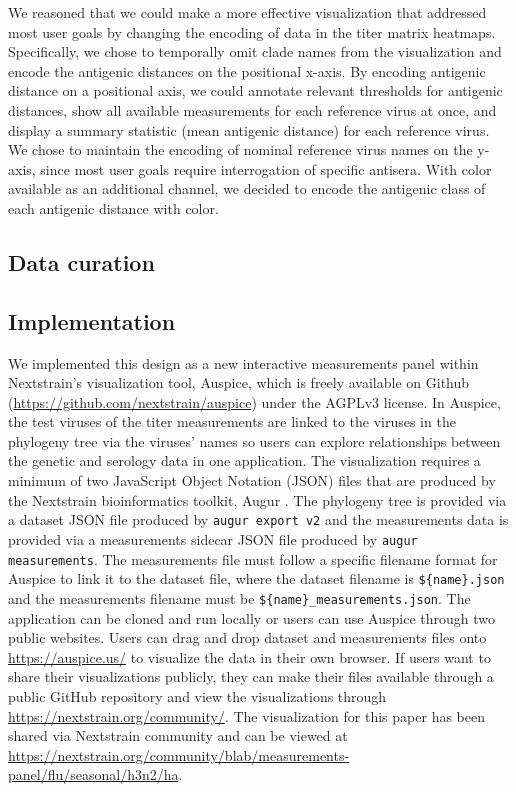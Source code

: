 \documentclass[utf8]{FrontiersinHarvard} %
\begin{document}
We reasoned that we could make a more effective visualization that addressed most user goals by changing the encoding of data in the titer matrix heatmaps.
Specifically, we chose to temporally omit clade names from the visualization and encode the antigenic distances on the positional x-axis.
By encoding antigenic distance on a positional axis, we could annotate relevant thresholds for antigenic distances, show all available measurements for each reference virus at once, and display a summary statistic (mean antigenic distance) for each reference virus.
We chose to maintain the encoding of nominal reference virus names on the y-axis, since most user goals require interrogation of specific antisera.
With color available as an additional channel, we decided to encode the antigenic class of each antigenic distance with color.

\subsection{Data curation}

\subsection{Implementation}

We implemented this design as a new interactive measurements panel within Nextstrain's visualization tool, Auspice, which is freely available on Github (\url{https://github.com/nextstrain/auspice}) under the AGPLv3 license.
In Auspice, the test viruses of the titer measurements are linked to the viruses in the phylogeny tree via the viruses' names so users can explore relationships between the genetic and serology data in one application.
The visualization requires a minimum of two JavaScript Object Notation (JSON) files that are produced by the Nextstrain bioinformatics toolkit, Augur \citep{Huddleston2021}.
The phylogeny tree is provided via a dataset JSON file produced by \texttt{augur export v2} and the measurements data is provided via a measurements sidecar JSON file produced by \texttt{augur measurements}.
The measurements file must follow a specific filename format for Auspice to link it to the dataset file, where the dataset filename is \texttt{\$\{name\}.json} and the measurements filename must be \texttt{\$\{name\}\_measurements.json}.
The application can be cloned and run locally or users can use Auspice through two public websites.
Users can drag and drop dataset and measurements files onto \url{https://auspice.us/} to visualize the data in their own browser.
If users want to share their visualizations publicly, they can make their files available through a public GitHub repository and view the visualizations through \url{https://nextstrain.org/community/}.
The visualization for this paper has been shared via Nextstrain community and can be viewed at \url{https://nextstrain.org/community/blab/measurements-panel/flu/seasonal/h3n2/ha}.
\end{document}

